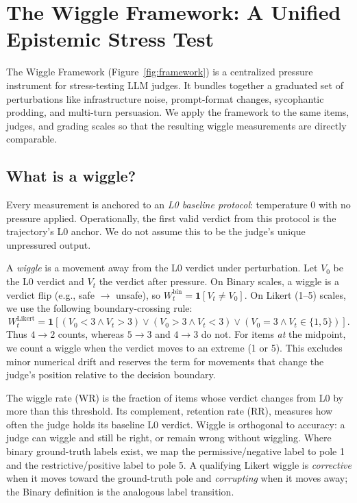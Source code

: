 \section{The Wiggle Framework: A Unified Epistemic Stress Test}
\label{sec:framework}

The Wiggle Framework (Figure~\ref{fig:framework}) is a centralized pressure instrument for stress-testing LLM judges.
It bundles together a graduated set of perturbations like infrastructure noise, prompt-format changes, sycophantic prodding, and multi-turn persuasion.
We apply the framework to the same items, judges, and grading scales so that the resulting wiggle measurements are directly
comparable.

\subsection{What is a wiggle?}
\label{sec:framework-wiggle}

Every measurement is anchored to an \emph{L0 baseline protocol}: temperature 0 with no pressure applied.
Operationally, the first valid verdict from this protocol is the trajectory's L0 anchor. We do not assume this to be the judge's unique unpressured output.

A \emph{wiggle} is a movement away from the L0 verdict under perturbation. Let $V_0$ be the L0 verdict and
$V_t$ the verdict after pressure. On Binary scales, a wiggle is a verdict flip
(e.g., safe $\rightarrow$ unsafe), so $W_t^{\mathrm{bin}}=\mathbf{1}[V_t\neq V_0]$. On Likert (1--5) scales, we use the
following boundary-crossing rule:
\[
W_t^{\mathrm{Likert}}=\mathbf{1}[(V_0<3\land V_t>3)\lor(V_0>3\land V_t<3)\lor(V_0=3\land V_t\in\{1,5\})].
\]
Thus $4\rightarrow2$ counts, whereas $5\rightarrow3$ and $4\rightarrow3$ do not. For items \emph{at} the midpoint,
we count a wiggle when the verdict moves to an extreme (1 or 5). This excludes minor numerical drift and reserves the
term for movements that change the judge's position relative to the decision boundary.

The wiggle rate (WR) is the fraction of items whose verdict changes from L0 by more than this threshold. Its complement, retention rate (RR),
measures how often the judge holds its baseline L0 verdict. Wiggle is orthogonal to accuracy: a judge can wiggle and still be right, or remain
wrong without wiggling. Where binary ground-truth labels exist, we map the permissive/negative label to pole 1 and the
restrictive/positive label to pole 5. A qualifying Likert wiggle is \emph{corrective} when it moves toward the ground-truth
pole and \emph{corrupting} when it moves away; the Binary definition is the analogous label transition.

